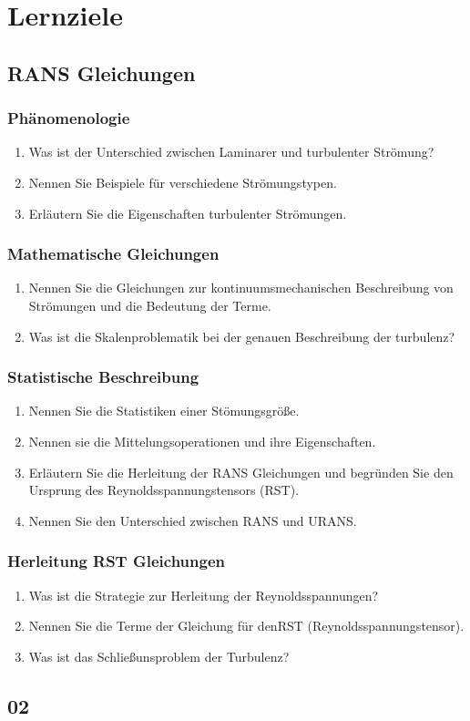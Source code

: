 \section{Lernziele}
\subsection{RANS Gleichungen}
\subsubsection{Phänomenologie}
\begin{enumerate}
	\item Was ist der Unterschied zwischen Laminarer und turbulenter Strömung?
	\item Nennen Sie Beispiele für verschiedene Strömungstypen.
	\item Erläutern Sie die Eigenschaften turbulenter Strömungen.
\end{enumerate}
\subsubsection{Mathematische Gleichungen}
\begin{enumerate}
	\item Nennen Sie die Gleichungen zur kontinuumsmechanischen Beschreibung von Strömungen und die Bedeutung der Terme. 
	\item Was ist die Skalenproblematik bei der genauen Beschreibung der turbulenz?
\end{enumerate}
\subsubsection{Statistische Beschreibung}
\begin{enumerate}
	\item Nennen Sie die Statistiken einer Stömungsgröße.
	\item Nennen sie die Mittelungsoperationen und ihre Eigenschaften. 
	\item Erläutern Sie die Herleitung der RANS Gleichungen und begründen Sie den Ursprung des Reynoldsspannungstensors (RST). 
	\item Nennen Sie den Unterschied zwischen RANS und URANS.
\end{enumerate}
\subsubsection{Herleitung RST Gleichungen}
\begin{enumerate}
	\item Was ist die Strategie zur Herleitung der Reynoldsspannungen?
	\item Nennen Sie die Terme der Gleichung für denRST  (Reynoldsspannungstensor).
	\item Was ist das Schließunsproblem der Turbulenz? 
\end{enumerate}


\subsection{02}